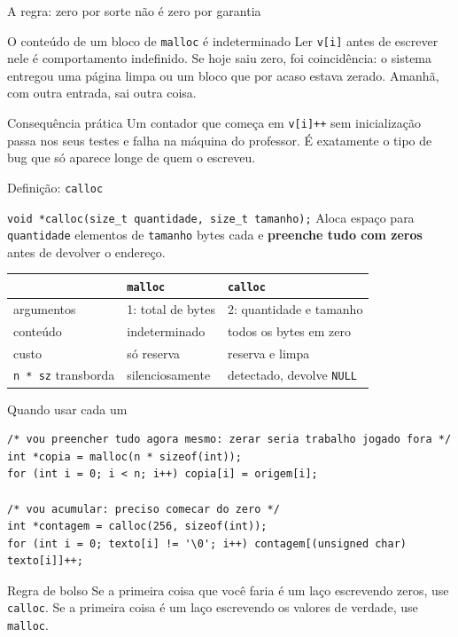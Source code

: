 \documentclass[aspectratio=169]{beamer}
\begin{document}
\begin{frame}{A regra: zero por sorte não é zero por garantia}
  \begin{alertblock}{O conteúdo de um bloco de \texttt{malloc} é indeterminado}
    Ler \texttt{v[i]} antes de escrever nele é comportamento indefinido. Se hoje
    saiu zero, foi coincidência: o sistema entregou uma página limpa ou um bloco
    que por acaso estava zerado. Amanhã, com outra entrada, sai outra coisa.
  \end{alertblock}
  \begin{exampleblock}{Consequência prática}
    Um contador que começa em \texttt{v[i]++} sem inicialização passa nos seus
    testes e falha na máquina do professor. É exatamente o tipo de bug que só
    aparece longe de quem o escreveu.
  \end{exampleblock}
\end{frame}

\begin{frame}{Definição: \texttt{calloc}}
  \begin{block}{\texttt{void *calloc(size\_t quantidade, size\_t tamanho);}}
    Aloca espaço para \texttt{quantidade} elementos de \texttt{tamanho} bytes
    cada e \textbf{preenche tudo com zeros} antes de devolver o endereço.
  \end{block}
  \begin{center}
  \small
  \begin{tabular}{lll}
    \toprule
     & \texttt{malloc} & \texttt{calloc} \\
    \midrule
    argumentos      & 1: total de bytes            & 2: quantidade e tamanho \\
    conteúdo        & indeterminado                & todos os bytes em zero \\
    custo           & só reserva                   & reserva e limpa \\
    \texttt{n * sz} transborda & silenciosamente   & detectado, devolve \texttt{NULL} \\
    \bottomrule
  \end{tabular}
  \end{center}
\end{frame}

\begin{frame}[fragile]{Quando usar cada um}
\begin{lstlisting}[basicstyle=\ttfamily\scriptsize]
/* vou preencher tudo agora mesmo: zerar seria trabalho jogado fora */
int *copia = malloc(n * sizeof(int));
for (int i = 0; i < n; i++) copia[i] = origem[i];

/* vou acumular: preciso comecar do zero */
int *contagem = calloc(256, sizeof(int));
for (int i = 0; texto[i] != '\0'; i++) contagem[(unsigned char) texto[i]]++;
\end{lstlisting}
  \begin{exampleblock}{Regra de bolso}
    Se a primeira coisa que você faria é um laço escrevendo zeros, use
    \texttt{calloc}. Se a primeira coisa é um laço escrevendo os valores de
    verdade, use \texttt{malloc}.
  \end{exampleblock}
\end{frame}
\end{document}
